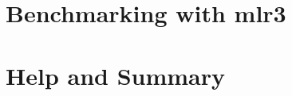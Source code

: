 \documentclass[11pt,compress,t,n
otes=noshow, aspectratio=169, xcolor=table]{beamer}
\begin{document}
\section{Benchmarking with mlr3}


\section{Help and Summary}




\endlecture
\end{document}

